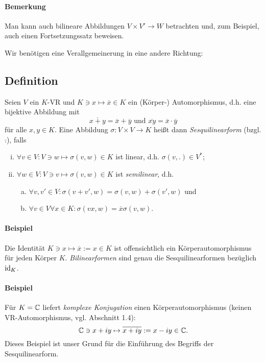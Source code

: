 \paragraph{Bemerkung}
	Man kann auch bilineare Abbildungen $ V\times V'\to W $ betrachten und, zum Beispiel, auch einen Fortsetzungssatz beweisen.
	
	Wir benötigen eine Verallgemeinerung in eine andere Richtung:
\subsection{Definition} 
\begin{Definition}[Sesquilinearform]
Seien $ V $ ein $ K $-VR und $ K\ni x\mapsto \overline{x}\in K $ ein (Körper-) Automorphismus, d.h. eine bijektive Abbildung mit
		\[ \overline{x+y} = \overline{x}+\overline{y} \text{ und } \overline{xy} = \overline{x}\cdot \overline{y} \]
	für alle $ x,y\in K $. Eine Abbildung $ \sigma: V\times V \to K $ heißt dann \emph{Sesquilinearform} (bzgl. $ \bar{.} $), falls
		\begin{enumerate}[(i)]
			\item $ \forall v\in V: V\ni w \mapsto \sigma(v,w)\in K $ ist linear, d.h. $ \sigma(v,.)\in V^* $;
			\item $ \forall w\in V: V\ni v \mapsto \sigma(v,w)\in K $ ist \emph{semilinear}, d.h.
				\begin{enumerate}[(a)]
					\item $ \forall v,v' \in V: \sigma(v+v',w) = \sigma(v,w)+\sigma(v',w) $ und
					\item $ \forall v\in V\forall x\in K: \sigma(vx,w) = \overline{x}\sigma(v,w) $.
				\end{enumerate}
		\end{enumerate}
\end{Definition}

\paragraph{Beispiel}
	Die Identität $ K\ni x\mapsto \overline{x}:= x\in K $ ist offensichtlich ein Körperautomorphismus für jeden Körper $ K $. \emph{Bilinearformen} sind genau die Sesquilinearformen bezüglich $ \operatorname{id}_K $.
\paragraph{Beispiel}
	Für $ K = \mathbb{C} $ liefert \emph{komplexe Konjugation} einen Körperautomorphismus (keinen VR-Automorphismus, vgl. Abschnitt 1.4):
		\[ \mathbb{C}\ni x+iy \mapsto \overline{x+iy}:= x-iy \in \mathbb{C}. \]
	Dieses Beispiel ist unser Grund für die Einführung des Begriffs der Sesquilinearform.

